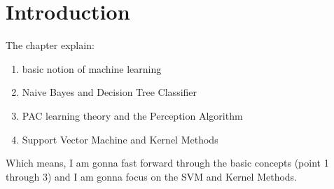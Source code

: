 \section{Introduction}

The chapter explain:
\begin{enumerate}
	\item basic notion of machine learning
	\item Naive Bayes and Decision Tree Classifier
	\item PAC learning theory and the Perception Algorithm
	\item Support Vector Machine and Kernel Methods
\end{enumerate}

Which means, I am gonna fast forward through the basic concepts (point 1 through
3) and I am gonna focus on the SVM and Kernel Methods.
